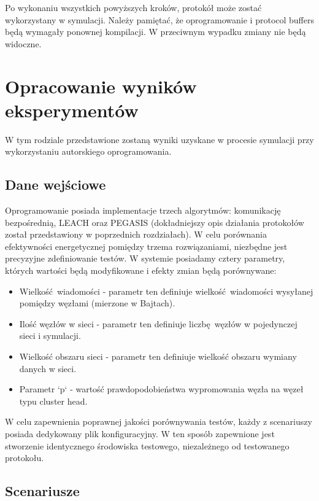 \documentclass[a4paper,12pt,twoside,openany]{report}
\begin{document}
Po wykonaniu wszystkich powyższych kroków, protokół może zostać wykorzystany w symulacji.
Należy pamiętać, że oprogramowanie i protocol buffers będą wymagały ponownej kompilacji. W przeciwnym wypadku zmiany nie będą widoczne.

\chapter{Opracowanie wyników eksperymentów}

W tym rodziale przedstawione zostaną wyniki uzyskane w procesie symulacji przy wykorzystaniu autorskiego oprogramowania.

\section{Dane wejściowe}

Oprogramowanie posiada implementacje trzech algorytmów: komunikację bezpośrednią, LEACH oraz PEGASIS (dokładniejszy opis działania protokołów został przedstawiony w poprzednich rozdziałach).
W celu porównania efektywności energetycznej pomiędzy trzema rozwiązaniami, niezbędne jest precyzyjne zdefiniowanie testów.
W systemie posiadamy cztery parametry, których wartości będą modyfikowane i efekty zmian będą porównywane:

\begin{itemize}
 \item Wielkość wiadomości - parametr ten definiuje wielkość wiadomości wysyłanej pomiędzy węzłami (mierzone w Bajtach).
 \item Ilość węzłów w sieci - parametr ten definiuje liczbę węzłów w pojedynczej sieci i symulacji.
 \item Wielkość obszaru sieci - parametr ten definiuje wielkość obszaru wymiany danych w sieci.
 \item Parametr `p` - wartość prawdopodobieństwa wypromowania węzła na węzeł typu cluster head.
\end{itemize}

W celu zapewnienia poprawnej jakości porównywania testów, każdy z scenariuszy posiada dedykowany plik konfiguracyjny.
W ten sposób zapewnione jest stworzenie identycznego środowiska testowego, niezależnego od testowanego protokołu.

\section{Scenariusze}
\end{document}
